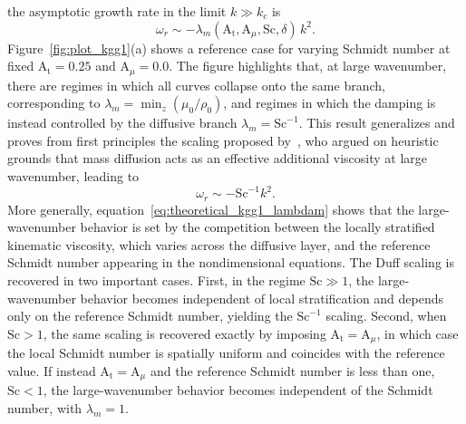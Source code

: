 \documentclass[11pt]{article}
\newcommand{\Atw}{\mathrm{A_t}}
\newcommand{\Sch}{\mathrm{Sc}}
\begin{document}
the asymptotic growth rate in the limit \(k \gg k_c\) is
\begin{equation}
    \omega_r \sim -\lambda_m(\Atw,\mathrm{A}_{\mu},\Sch,\delta)\,k^{2}.
\end{equation}
Figure~\ref{fig:plot_kgg1}(a) shows a reference case for varying Schmidt number at fixed \(\Atw = 0.25\) and \(\mathrm{A}_{\mu} = 0.0\). The figure highlights that, at large wavenumber, there are regimes in which all curves collapse onto the same branch, corresponding to \(\lambda_m = \min_{z}(\mu_0/\rho_0)\), and regimes in which the damping is instead controlled by the diffusive branch \(\lambda_m = \Sch^{-1}\). This result generalizes and proves from first principles the scaling proposed by~\citet{duff-harlow-hirt-1962}, who argued on heuristic grounds that mass diffusion acts as an effective additional viscosity at large wavenumber, leading to
\begin{equation}
    \omega_r \sim -\Sch^{-1} k^2.
\end{equation}
More generally, equation~\eqref{eq:theoretical_kgg1_lambdam} shows that the large-wavenumber behavior is set by the competition between the locally stratified kinematic viscosity, which varies across the diffusive layer, and the reference Schmidt number appearing in the nondimensional equations. The Duff scaling is recovered in two important cases. First, in the regime \(\Sch \gg 1\), the large-wavenumber behavior becomes independent of local stratification and depends only on the reference Schmidt number, yielding the \(\Sch^{-1}\) scaling. Second, when \(\Sch > 1\), the same scaling is recovered exactly by imposing \(\Atw = \mathrm{A}_{\mu}\), in which case the local Schmidt number is spatially uniform and coincides with the reference value. If instead \(\Atw = \mathrm{A}_{\mu}\) and the reference Schmidt number is less than one, \(\Sch < 1\), the large-wavenumber behavior becomes independent of the Schmidt number, with \(\lambda_m = 1\).
\end{document}
